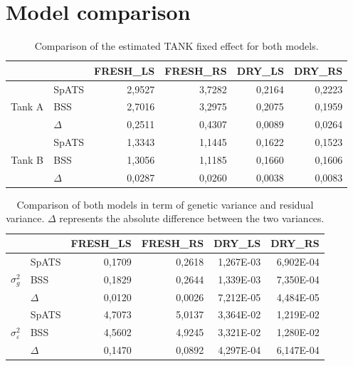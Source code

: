 \section{Model comparison}

\begin{table}[htbp]
  \centering
  \caption{Comparison of the estimated TANK fixed effect for both models.}
    \begin{tabular}{clrrrr}
    \toprule
          &       & \multicolumn{1}{l}{FRESH\_LS} & \multicolumn{1}{l}{FRESH\_RS} & \multicolumn{1}{l}{DRY\_LS} & \multicolumn{1}{l}{DRY\_RS} \\
    \midrule
    \multirow{3}[1]{*}{Tank A} & SpATS & 2,9527 & 3,7282 & 0,2164 & 0,2223 \\
          & BSS   & 2,7016 & 3,2975 & 0,2075 & 0,1959 \\
          & $\Delta$ & 0,2511 & 0,4307 & 0,0089 & 0,0264 \\
    \midrule
    \multirow{3}[1]{*}{Tank B} & SpATS & 1,3343 & 1,1445 & 0,1622 & 0,1523 \\
          & BSS   & 1,3056 & 1,1185 & 0,1660 & 0,1606 \\
          & $\Delta$ & 0,0287 & 0,0260 & 0,0038 & 0,0083 \\
    \bottomrule
    \end{tabular}%

  \label{tab:tank_effect_model_comparison}%
\end{table}%


\begin{table}[htbp]
  \centering
  \caption[Comparison of both models in term of genetic variance and residual variance]{Comparison of both models in term of genetic variance and residual variance. $\Delta$ represents the absolute difference between the two variances. }
    \begin{tabular}{clrrrr}
    \toprule
          &       & \multicolumn{1}{l}{FRESH\_LS} & \multicolumn{1}{l}{FRESH\_RS} & \multicolumn{1}{l}{DRY\_LS} & \multicolumn{1}{l}{DRY\_RS} \\
    \midrule
    \multirow{3}[2]{*}{$\sigma^2_{g}$} & SpATS & 0,1709 & 0,2618 & 1,267E-03 & 6,902E-04 \\
          & BSS   & 0,1829 & 0,2644 & 1,339E-03 & 7,350E-04 \\
          & $\Delta$ & 0,0120 & 0,0026 & 7,212E-05 & 4,484E-05 \\
    \midrule
    \multirow{3}[2]{*}{$\sigma^2_{\varepsilon}$} & SpATS & 4,7073 & 5,0137 & 3,364E-02 & 1,219E-02 \\
          & BSS   & 4,5602 & 4,9245 & 3,321E-02 & 1,280E-02 \\
          & $\Delta$ & 0,1470 & 0,0892 & 4,297E-04 & 6,147E-04 \\
    \bottomrule
    \end{tabular}%

  \label{tab:sigma_model_comparison}%
\end{table}%


